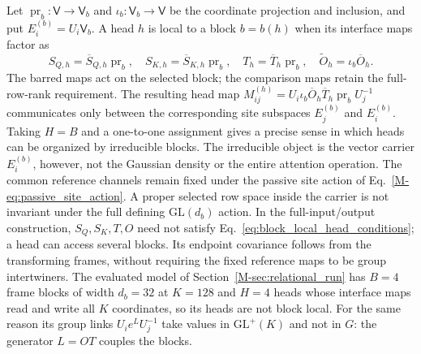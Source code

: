 \documentclass[twoside,11pt]{article}
\begin{document}
Let $\operatorname{pr}_b:\mathsf V\to\mathsf V_b$ and $\iota_b:\mathsf V_b\to\mathsf V$ be the coordinate projection and inclusion, and put $E_i^{(b)}=U_i\mathsf V_b$. A head $h$ is local to a block $b=b(h)$ when its interface maps factor as
\begin{equation}
S_{Q,h}=\overline S_{Q,h}\operatorname{pr}_b,\quad
S_{K,h}=\overline S_{K,h}\operatorname{pr}_b,\quad
T_h=\overline T_h\operatorname{pr}_b,\quad
\widetilde O_h=\iota_b\overline O_h.
\label{eq:block_local_head_conditions}
\end{equation}
The barred maps act on the selected block; the comparison maps retain the full-row-rank requirement. The resulting head map $M_{ij}^{(h)}=U_i\iota_b\overline O_h\overline T_h\operatorname{pr}_bU_j^{-1}$ communicates only between the corresponding site subspaces $E_j^{(b)}$ and $E_i^{(b)}$. Taking $H=B$ and a one-to-one assignment gives a precise sense in which heads can be organized by irreducible blocks. The irreducible object is the vector carrier $E_i^{(b)}$, however, not the Gaussian density or the entire attention operation. The common reference channels remain fixed under the passive site action of Eq.~\eqref{M-eq:passive_site_action}. A proper selected row space inside the carrier is not invariant under the full defining $\mathrm{GL}(d_b)$ action. In the full-input/output construction, $S_Q,S_K,T,O$ need not satisfy Eq.~\eqref{eq:block_local_head_conditions}; a head can access several blocks. Its endpoint covariance follows from the transforming frames, without requiring the fixed reference maps to be group intertwiners. The evaluated model of Section~\ref{M-sec:relational_run} has $B=4$ frame blocks of width $d_b=32$ at $K=128$ and $H=4$ heads whose interface maps read and write all $K$ coordinates, so its heads are not block local. For the same reason its group links $U_ie^{L}U_j^{-1}$ take values in $\mathrm{GL}^+(K)$ and not in $G$: the generator $L=OT$ couples the blocks.
\end{document}
